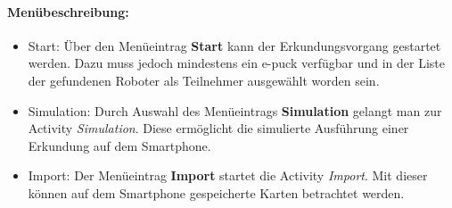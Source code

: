 \documentclass[10pt,a4paper]{article}
\begin{document}
		\paragraph*{Menübeschreibung:}
		\begin{itemize}
			\item Start: Über den Men\"ueintrag \textbf{Start} kann der Erkundungsvorgang gestartet werden. Dazu muss jedoch mindestens ein e-puck
			verf\"ugbar und in der Liste der gefundenen Roboter als Teilnehmer ausgew\"ahlt worden sein.
			\item Simulation: Durch Auswahl des Men\"ueintrags \textbf{Simulation} gelangt man zur Activity \textit{Simulation}. Diese erm\"oglicht
			die simulierte Ausf\"uhrung einer Erkundung auf dem Smartphone.
			\item Import: Der Men\"ueintrag \textbf{Import} startet die Activity \textit{Import}. Mit dieser k\"onnen auf dem Smartphone gespeicherte
			Karten betrachtet werden.
		\end{itemize}
\end{document}
